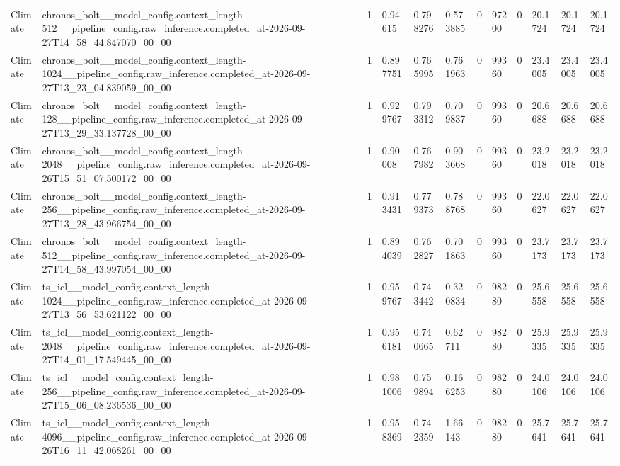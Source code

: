 \begin{tabular}{llllllllllll}
Climate & chronos\_bolt\_\_model\_config.context\_length-512\_\_pipeline\_config.raw\_inference.completed\_at-2026-09-27T14\_58\_44.847070\_00\_00 & 1 & 0.94615 & 0.798276 & 0.573885 & 0 & 97200 & 0 & 20.1724 & 20.1724 & 20.1724 \\
Climate & chronos\_bolt\_\_model\_config.context\_length-1024\_\_pipeline\_config.raw\_inference.completed\_at-2026-09-27T13\_23\_04.839059\_00\_00 & 1 & 0.897751 & 0.765995 & 0.761963 & 0 & 99360 & 0 & 23.4005 & 23.4005 & 23.4005 \\
Climate & chronos\_bolt\_\_model\_config.context\_length-128\_\_pipeline\_config.raw\_inference.completed\_at-2026-09-27T13\_29\_33.137728\_00\_00 & 1 & 0.929767 & 0.793312 & 0.709837 & 0 & 99360 & 0 & 20.6688 & 20.6688 & 20.6688 \\
Climate & chronos\_bolt\_\_model\_config.context\_length-2048\_\_pipeline\_config.raw\_inference.completed\_at-2026-09-26T15\_51\_07.500172\_00\_00 & 1 & 0.90008 & 0.767982 & 0.903668 & 0 & 99360 & 0 & 23.2018 & 23.2018 & 23.2018 \\
Climate & chronos\_bolt\_\_model\_config.context\_length-256\_\_pipeline\_config.raw\_inference.completed\_at-2026-09-27T13\_28\_43.966754\_00\_00 & 1 & 0.913431 & 0.779373 & 0.788768 & 0 & 99360 & 0 & 22.0627 & 22.0627 & 22.0627 \\
Climate & chronos\_bolt\_\_model\_config.context\_length-512\_\_pipeline\_config.raw\_inference.completed\_at-2026-09-27T14\_58\_43.997054\_00\_00 & 1 & 0.894039 & 0.762827 & 0.701863 & 0 & 99360 & 0 & 23.7173 & 23.7173 & 23.7173 \\
Climate & ts\_icl\_\_model\_config.context\_length-1024\_\_pipeline\_config.raw\_inference.completed\_at-2026-09-27T13\_56\_53.621122\_00\_00 & 1 & 0.959767 & 0.743442 & 0.320834 & 0 & 98280 & 0 & 25.6558 & 25.6558 & 25.6558 \\
Climate & ts\_icl\_\_model\_config.context\_length-2048\_\_pipeline\_config.raw\_inference.completed\_at-2026-09-27T14\_01\_17.549445\_00\_00 & 1 & 0.956181 & 0.740665 & 0.62711 & 0 & 98280 & 0 & 25.9335 & 25.9335 & 25.9335 \\
Climate & ts\_icl\_\_model\_config.context\_length-256\_\_pipeline\_config.raw\_inference.completed\_at-2026-09-27T15\_06\_08.236536\_00\_00 & 1 & 0.981006 & 0.759894 & 0.166253 & 0 & 98280 & 0 & 24.0106 & 24.0106 & 24.0106 \\
Climate & ts\_icl\_\_model\_config.context\_length-4096\_\_pipeline\_config.raw\_inference.completed\_at-2026-09-26T16\_11\_42.068261\_00\_00 & 1 & 0.958369 & 0.742359 & 1.66143 & 0 & 98280 & 0 & 25.7641 & 25.7641 & 25.7641 \\

\end{tabular}
